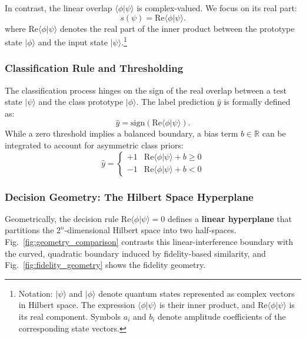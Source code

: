 \documentclass[conference]{IEEEtran}
\begin{document}
In contrast, the linear overlap $\langle \phi | \psi \rangle$ is complex-valued. We focus on its real part:
\begin{equation}
s(\psi) = \mathrm{Re}\langle \phi | \psi \rangle.
\end{equation}
where $\mathrm{Re}\langle \phi | \psi \rangle$ denotes the real part of the inner product between the prototype state $|\phi\rangle$ and the input state $|\psi\rangle$.\footnote{Notation: $|\psi\rangle$ and $|\phi\rangle$ denote quantum states represented as complex vectors in Hilbert space. The expression $\langle \phi | \psi \rangle$ is their inner product, and $\mathrm{Re}\langle \phi | \psi \rangle$ is its real component. Symbols $a_i$ and $b_i$ denote amplitude coefficients of the corresponding state vectors.}

\subsubsection{Classification Rule and Thresholding}
The classification process hinges on the sign of the real overlap between a test state $|\psi\rangle$ and the class prototype $|\phi\rangle$. The label prediction $\hat{y}$ is formally defined as:
\begin{equation}
\hat{y} = \text{sign}\left( \mathrm{Re}\langle \phi | \psi \rangle \right).
\end{equation}
While a zero threshold implies a balanced boundary, a bias term $b \in \mathbb{R}$ can be integrated to account for asymmetric class priors:
\begin{equation}
\hat{y} = \begin{cases} +1 & \mathrm{Re}\langle \phi | \psi \rangle + b \geq 0 \\ -1 & \mathrm{Re}\langle \phi | \psi \rangle + b < 0 \end{cases}
\end{equation}

\subsubsection{Decision Geometry: The Hilbert Space Hyperplane}
Geometrically, the decision rule $\mathrm{Re}\langle \phi | \psi \rangle = 0$ defines a \textbf{linear hyperplane} that partitions the $2^n$-dimensional Hilbert space into two half-spaces. Fig.~\ref{fig:geometry_comparison} contrasts this linear-interference boundary with the curved, quadratic boundary induced by fidelity-based similarity, and Fig.~\ref{fig:fidelity_geometry} shows the fidelity geometry.
\end{document}
